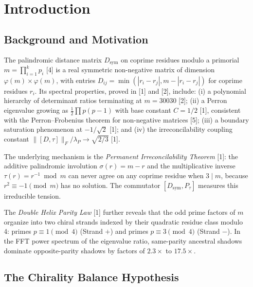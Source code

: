 \documentclass[11pt,letterpaper]{article}
\theoremstyle{definition}
\theoremstyle{remark}
\begin{document}
\clearpage
\tableofcontents
\clearpage

\section{Introduction}\label{introduction}

\subsection{Background and Motivation}\label{background-and-motivation}

The palindromic distance matrix $D_{\text{sym}}$ on coprime residues modulo a primorial $m = \prod_{i=1}^k p_i$ [4] is a real symmetric non-negative matrix of dimension $\varphi(m) \times \varphi(m)$, with entries $D_{ij} = \min(|r_i - r_j|, m - |r_i - r_j|)$ for coprime residues $r_i$. Its spectral properties, proved in [1] and [2], include: (i) a polynomial hierarchy of determinant ratios terminating at $m = 30030$ [2]; (ii) a Perron eigenvalue growing as $\tfrac{1}{2}\prod p(p-1)$ with base constant $C = 1/2$ [1], consistent with the Perron--Frobenius theorem for non-negative matrices [5]; (iii) a boundary saturation phenomenon at $-1/\sqrt{2}$ [1]; and (iv) the irreconcilability coupling constant $\|[D,\tau]\|_F / \lambda_P \to \sqrt{2/3}$ [1].

The underlying mechanism is the \emph{Permanent Irreconcilability Theorem} [1]: the additive palindromic involution $\sigma(r) = m - r$ and the multiplicative inverse $\tau(r) = r^{-1} \bmod m$ can never agree on any coprime residue when $3 \mid m$, because $r^2 \equiv -1 \pmod{m}$ has no solution. The commutator $[D_{\text{sym}}, P_\tau]$ measures this irreducible tension.

The \emph{Double Helix Parity Law} [1] further reveals that the odd prime factors of $m$ organize into two chiral strands indexed by their quadratic residue class modulo 4: primes $p \equiv 1 \pmod{4}$ (Strand $+$) and primes $p \equiv 3 \pmod{4}$ (Strand $-$). In the FFT power spectrum of the eigenvalue ratio, same-parity ancestral shadows dominate opposite-parity shadows by factors of $2.3\times$ to $17.5\times$.

\subsection{The Chirality Balance Hypothesis}\label{the-chirality-balance-hypothesis}
\end{document}
